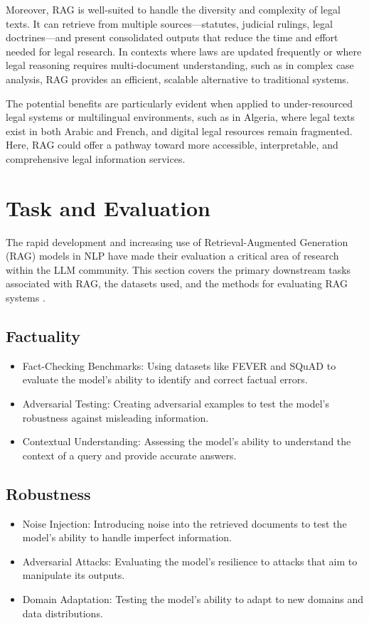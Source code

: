 Moreover, RAG is well-suited to handle the diversity and complexity of legal texts. It can retrieve from multiple sources—statutes, judicial rulings, legal doctrines—and present consolidated outputs that reduce the time and effort needed for legal research. In contexts where laws are updated frequently or where legal reasoning requires multi-document understanding, such as in complex case analysis, RAG provides an efficient, scalable alternative to traditional systems.

The potential benefits are particularly evident when applied to under-resourced legal systems or multilingual environments, such as in Algeria, where legal texts exist in both Arabic and French, and digital legal resources remain fragmented. Here, RAG could offer a pathway toward more accessible, interpretable, and comprehensive legal information services\cite{asteraRAG}.


\section{Task and Evaluation}
The rapid development and increasing use of Retrieval-Augmented Generation (RAG) models in NLP have made their evaluation a critical area of research within the LLM community. This section covers the primary downstream tasks associated with RAG, the datasets used, and the methods for evaluating RAG systems \cite{zhou2020trustworthiness}.
\subsection{Factuality}
\begin{itemize}
	\item Fact-Checking Benchmarks: Using datasets like FEVER and SQuAD to evaluate the model's ability to identify and correct factual errors.
	\item Adversarial Testing: Creating adversarial examples to test the model's robustness against misleading information.
	\item Contextual Understanding: Assessing the model's ability to understand the context of a query and provide accurate answers.
\end{itemize}
\subsection{ Robustness}
\begin{itemize}
	\item Noise Injection: Introducing noise into the retrieved documents to test the model's ability to handle imperfect information.
	\item Adversarial Attacks: Evaluating the model's resilience to attacks that aim to manipulate its outputs.
	\item Domain Adaptation: Testing the model's ability to adapt to new domains and data distributions.
\end{itemize}
